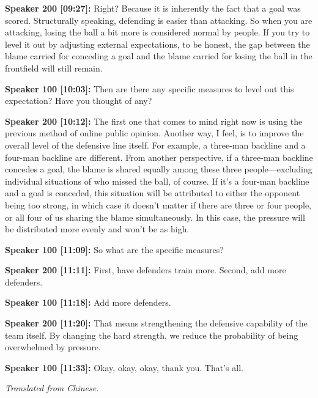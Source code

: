 \documentclass[11pt,a4paper]{article}
\begin{document}
\begin{linenumbers}
\vspace{0.5em}
\noindent \textbf{Speaker 200 [09:27]:} Right? Because it is inherently the fact that a goal was scored. Structurally speaking, defending is easier than attacking. So when you are attacking, losing the ball a bit more is considered normal by people. If you try to level it out by adjusting external expectations, to be honest, the gap between the blame carried for conceding a goal and the blame carried for losing the ball in the frontfield will still remain. 

\vspace{0.5em}
\noindent \textbf{Speaker 100 [10:03]:} Then are there any specific measures to level out this expectation? Have you thought of any? 

\vspace{0.5em}
\noindent \textbf{Speaker 200 [10:12]:} The first one that comes to mind right now is using the previous method of online public opinion. Another way, I feel, is to improve the overall level of the defensive line itself. For example, a three-man backline and a four-man backline are different. From another perspective, if a three-man backline concedes a goal, the blame is shared equally among these three people—excluding individual situations of who missed the ball, of course. If it's a four-man backline and a goal is conceded, this situation will be attributed to either the opponent being too strong, in which case it doesn't matter if there are three or four people, or all four of us sharing the blame simultaneously. In this case, the pressure will be distributed more evenly and won't be as high. 

\vspace{0.5em}
\noindent \textbf{Speaker 100 [11:09]:} So what are the specific measures? 

\vspace{0.5em}
\noindent \textbf{Speaker 200 [11:11]:} First, have defenders train more. Second, add more defenders. 

\vspace{0.5em}
\noindent \textbf{Speaker 100 [11:18]:} Add more defenders. 

\vspace{0.5em}
\noindent \textbf{Speaker 200 [11:20]:} That means strengthening the defensive capability of the team itself. By changing the hard strength, we reduce the probability of being overwhelmed by pressure. 

\vspace{0.5em}
\noindent \textbf{Speaker 100 [11:33]:} Okay, okay, okay, thank you. That's all.

\end{linenumbers}

\vspace{1em}

\textit{Translated from Chinese.}
\end{document}

